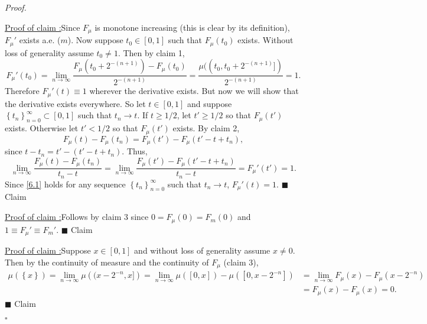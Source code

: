 \documentclass[12pt]{article}
\newcounter{ProofCounter}
\newcounter{ClaimCounter}[ProofCounter]
\newenvironment{Proof}{\stepcounter{ProofCounter}\textit{Proof.}}{\hfill$\square$}
\newenvironment{claim}[1]{\vspace{1mm}\stepcounter{ClaimCounter}\par\noindent\underline{\bf Claim \theClaimCounter:}\space#1}{}
\newenvironment{claimproof}[1]{\par\noindent\underline{Proof of claim \theClaimCounter:}\space#1}{\hfill $\blacksquare$ Claim \theClaimCounter}
\begin{document}
\begin{Proof}
\begin{claimproof}
Since $F_{\mu}$ is monotone increasing (this is clear by its definition), $F_{\mu}'$ exists a.e. ($m$). Now suppose $t_{0} \in [0,1]$ such that
$F_{\mu}(t_{0})$ exists. Without loss of generality assume $t_{0} \neq 1$. Then by claim 1,
\[ F_{\mu}'(t_{0}) = \lim_{n\rightarrow\infty}\frac{F_{\mu}(t_{0} + 2^{-(n+1)}) - F_{\mu}(t_{0})}{2^{-(n+1)}} = \frac{\mu(
(t_{0},t_{0}+2^{-(n+1)}])}{2^{-(n+1)}} = 1. \]
Therefore $F_{\mu}'(t) \equiv 1$ wherever the derivative exists. But now we will show that the derivative exists everywhere. So let $t \in [0,1]$ and
suppose $\left\{ t_{n} \right\}_{n=0}^{\infty} \subset [0,1]$ such that $t_{n} \rightarrow t$. If $t \geq 1/2$, let $t' \geq 1/2$ so that
$F_{\mu}(t')$ exists. Otherwise let $t' < 1/2$ so that $F_{\mu}(t')$ exists. By claim 2,
\[ F_{\mu}(t) - F_{\mu}(t_{n}) = F_{\mu}(t') - F_{\mu}(t' - t + t_{n}), \]
since $t - t_{n} = t' - (t' - t + t_{n})$. Thus, 
\begin{equation}
\lim_{n\rightarrow\infty}\frac{F_{\mu}(t) - F_{\mu}(t_{n})}{t_{n} - t} = \lim_{n\rightarrow\infty}\frac{F_{\mu}(t') - F_{\mu}(t' - t + t_{n})}{t_{n} -
t} = F_{\mu}'(t') = 1.
\label{6.1}
\end{equation}
Since \eqref{6.1} holds for any sequence $\left\{ t_{n} \right\}_{n=0}^{\infty}$ such that $t_{n} \rightarrow t$, $F_{\mu}'(t) = 1$.
\end{claimproof}

\begin{claimproof}
Follows by claim 3 since $0 = F_{\mu}(0) = F_{m}(0)$ and $1 \equiv F_{\mu}' \equiv F_{m}'$.
\end{claimproof}

\begin{claimproof}
Suppose $x \in [0,1]$ and without loss of generality assume $x \neq 0$. Then by the continuity of measure and the continuity of $F_{\mu}$ (claim 3),
\begin{align*}
\mu\left( \left\{ x \right\} \right) = \lim_{n\rightarrow\infty}\mu\left( (x-2^{-n},x] \right) = \lim_{n\rightarrow\infty}\mu([0,x]) -
\mu([0,x-2^{-n}]) & = \lim_{n\rightarrow\infty}F_{\mu}(x) - F_{\mu}(x - 2^{-n}) \\
& = F_{\mu}(x) - F_{\mu}(x) = 0. 
\end{align*}
\end{claimproof}


\end{Proof}
\end{document}
